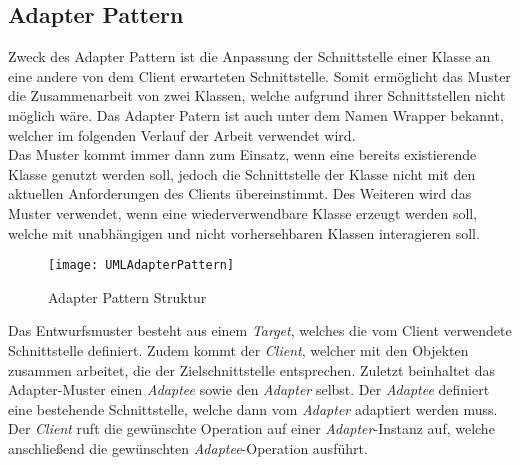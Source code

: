 \subsection{Adapter Pattern}\label{sec:AdapterPattern}
Zweck des Adapter Pattern ist die Anpassung der Schnittstelle einer Klasse an eine andere von dem Client erwarteten Schnittstelle. Somit ermöglicht das Muster die Zusammenarbeit von zwei Klassen, welche aufgrund ihrer Schnittstellen nicht möglich wäre. Das Adapter Patern ist auch unter dem Namen Wrapper bekannt, welcher im folgenden Verlauf der Arbeit verwendet wird.\\
Das Muster kommt immer dann zum Einsatz, wenn eine bereits existierende Klasse genutzt werden soll, jedoch die Schnittstelle der Klasse nicht mit den aktuellen Anforderungen des Clients übereinstimmt. Des Weiteren wird das Muster verwendet, wenn eine wiederverwendbare Klasse erzeugt werden soll, welche mit unabhängigen und nicht vorhersehbaren Klassen interagieren soll.\\
\vspace{-0.5cm}
\begin{center}
    \begin{figure}[h]
     \centering
     \texttt{[image: UMLAdapterPattern]}
     \caption{Adapter Pattern Struktur \cite{DesignPatterns}}
    \label{fig:AdapterPattern}
    \end{figure}
\end{center}
\vspace{-2cm}
Das Entwurfsmuster besteht aus einem \textit{Target}, welches die vom Client verwendete Schnittstelle definiert. Zudem kommt der \textit{Client}, welcher mit den Objekten zusammen arbeitet, die der Zielschnittstelle entsprechen. Zuletzt beinhaltet das Adapter-Muster einen \textit{Adaptee} sowie den \textit{Adapter} selbst. Der \textit{Adaptee} definiert eine bestehende Schnittstelle, welche dann vom \textit{Adapter} adaptiert werden muss.\\ 
Der \textit{Client} ruft die gewünschte Operation auf einer \textit{Adapter}-Instanz auf, welche anschließend die gewünschten \textit{Adaptee}-Operation ausführt.

